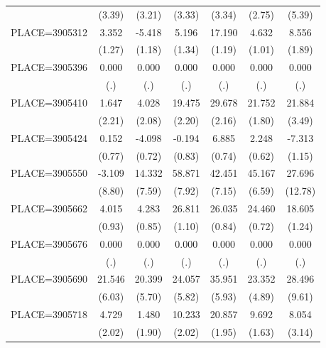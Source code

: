 {\begin{tabular}{l*{6}{c}}
                    &      (3.39)&      (3.21)&      (3.33)&      (3.34)&      (2.75)&      (5.39)\\
PLACE=3905312       &       3.352&      -5.418&       5.196&      17.190&       4.632&       8.556\\
                    &      (1.27)&      (1.18)&      (1.34)&      (1.19)&      (1.01)&      (1.89)\\
PLACE=3905396       &       0.000&       0.000&       0.000&       0.000&       0.000&       0.000\\
                    &         (.)&         (.)&         (.)&         (.)&         (.)&         (.)\\
PLACE=3905410       &       1.647&       4.028&      19.475&      29.678&      21.752&      21.884\\
                    &      (2.21)&      (2.08)&      (2.20)&      (2.16)&      (1.80)&      (3.49)\\
PLACE=3905424       &       0.152&      -4.098&      -0.194&       6.885&       2.248&      -7.313\\
                    &      (0.77)&      (0.72)&      (0.83)&      (0.74)&      (0.62)&      (1.15)\\
PLACE=3905550       &      -3.109&      14.332&      58.871&      42.451&      45.167&      27.696\\
                    &      (8.80)&      (7.59)&      (7.92)&      (7.15)&      (6.59)&     (12.78)\\
PLACE=3905662       &       4.015&       4.283&      26.811&      26.035&      24.460&      18.605\\
                    &      (0.93)&      (0.85)&      (1.10)&      (0.84)&      (0.72)&      (1.24)\\
PLACE=3905676       &       0.000&       0.000&       0.000&       0.000&       0.000&       0.000\\
                    &         (.)&         (.)&         (.)&         (.)&         (.)&         (.)\\
PLACE=3905690       &      21.546&      20.399&      24.057&      35.951&      23.352&      28.496\\
                    &      (6.03)&      (5.70)&      (5.82)&      (5.93)&      (4.89)&      (9.61)\\
PLACE=3905718       &       4.729&       1.480&      10.233&      20.857&       9.692&       8.054\\
                    &      (2.02)&      (1.90)&      (2.02)&      (1.95)&      (1.63)&      (3.14)\\

\end{tabular}}
